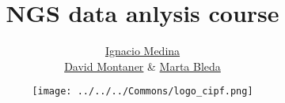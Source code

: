 \documentclass{beamer}
\begin{document}


\title[\hspace{2em} NGS data anlysis course \hspace{8em} \insertframenumber\ / \inserttotalframenumber]{NGS data anlysis course}

\subtitle{{\color{gray}\titulolargo}} %

\author[\titulocorto \hspace{2em}]{
\href{http://www.dmontaner.com}{Ignacio Medina} \\
\href{http://www.dmontaner.com}{David Montaner}  
 \& \href{http://www.dmontaner.com}{Marta Bleda}}


\date{\texttt{[image: ../../../Commons/logo\_cipf.png]}}

\begin{frame}
  \maketitle
\end{frame}



\end{document}
